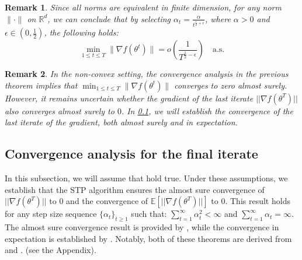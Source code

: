 \documentclass{article} %
\newtheorem{Remark}{Remark}
\begin{document}
\noindent
\begin{Remark}\label{Rem3}
Since all norms are equivalent in finite dimension, for any norm \( \lVert \cdot \rVert \) on \( \mathbb{R}^d \), we can conclude that by selecting \( \alpha_t = \frac{\alpha}{t^{\frac{1}{2} + \epsilon}} \), where \( \alpha > 0 \) and \( \epsilon \in \left(0, \frac{1}{2}\right) \), the following holds:
\[
\min_{1 \le t \le T} \lVert \nabla f(\theta^t) \rVert = o\left(\frac{1}{T^{\frac{1}{2}-\epsilon}}\right) \quad \text{a.s.}
\]

\end{Remark}
\begin{Remark}\label{Rem4}
In the non-convex setting, the convergence analysis in the previous theorem implies
that $\min_{1 \leq t \leq T} \lVert \nabla f(\theta^t) \rVert$ converges to zero almost surely. However, it remains uncertain whether the gradient of the last iterate $||\nabla f(\theta^T)||$ also converges almost surely to $0$.  In \cref{seclast}, we will establish the convergence of the last iterate of the gradient, both almost surely and in expectation.
\end{Remark}



\subsection{Convergence analysis for the final iterate}\label{seclast}
In this subsection, we will assume that  hold true. 
Under these assumptions,
we establish that the STP algorithm ensures the almost sure convergence of $||\nabla f(\theta^T)||$ to 0 and the convergence of $\mathbb{E}[ ||\nabla f(\theta^T) ||]$ to 0. This result holds for any step size sequence $\{\alpha_t\}_{t \ge 1}$ such that: $\sum_{t=1}^{\infty} \alpha_t^2 <\infty$ and $\sum_{t =1}^{\infty} \alpha_t=\infty$.
The almost sure convergence result is provided by , while the convergence in expectation is established by . Notably, both of these theorems are derived from  and  . (see the Appendix).  
\end{document}
